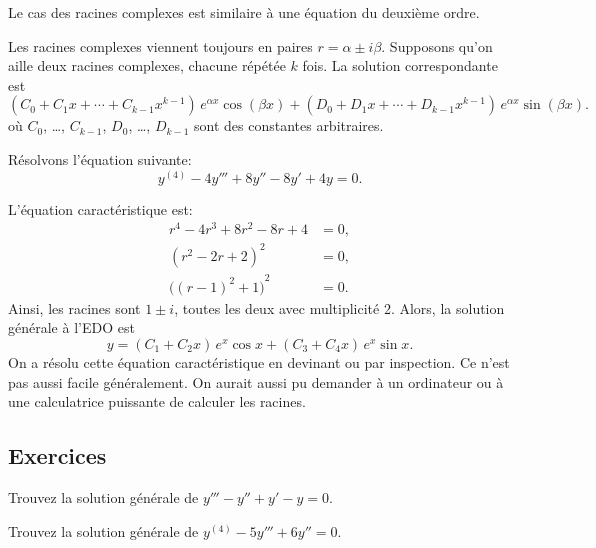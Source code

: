 Le cas des racines complexes est similaire à une équation du deuxième ordre. 

Les racines complexes viennent toujours en paires 
$r = \alpha \pm i \beta$.  Supposons qu'on aille deux racines complexes, chacune répétée $k$ fois.
La solution correspondante est 
\begin{equation*}
	( C_0 + C_1 x + \cdots + C_{k-1} x^{k-1} ) \, e^{\alpha x} \cos (\beta x)
	+
	( D_0 + D_1 x + \cdots + D_{k-1} x^{k-1} ) \, e^{\alpha x} \sin (\beta x) .
\end{equation*}
où $C_0$, \ldots, $C_{k-1}$, $D_0$, \ldots, $D_{k-1}$ sont des constantes arbitraires. 

\begin{example}
	Résolvons l'équation suivante: 
	\begin{equation*}
		y^{(4)} - 4 y''' + 8 y'' - 8 y' + 4y = 0 .
	\end{equation*}
	
	L'équation caractéristique est: 
	\begin{align*}
		r^4 - 4 r^3 + 8 r^2 - 8 r + 4 & = 0 , \\
		{(r^2-2r+2)}^2 & = 0 , \\
		{\bigl({(r-1)}^2+1\bigr)}^2 & = 0 .
	\end{align*}
	Ainsi, les racines sont  $1 \pm i$, toutes les deux avec multiplicité 2. Alors, la solution générale à l'EDO est  
	\begin{equation*}
		y = ( C_1 + C_2 x ) \, e^{x} \cos x + ( C_3 + C_4 x ) \, e^{x} \sin x .
	\end{equation*}
	On a résolu cette équation caractéristique en devinant ou par inspection. Ce n'est pas aussi facile généralement. On aurait aussi pu demander à un ordinateur ou à une calculatrice puissante de calculer les racines. 
\end{example}


\subsection{Exercices}

\begin{exercise}
Trouvez la solution générale de $y''' - y'' + y' - y = 0$.
\end{exercise}

\begin{exercise}
Trouvez la solution générale de $y^{(4)} - 5 y''' + 6 y'' = 0$.
\end{exercise}


